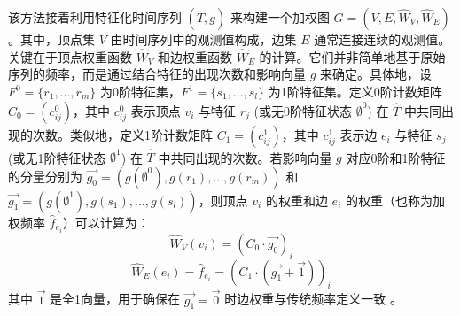 该方法接着利用特征化时间序列 $(\hat{T}, g)$ 来构建一个加权图 $G=(V,E,\hat{W}_V,\hat{W}_E)$。其中，顶点集 $V$ 由时间序列中的观测值构成，边集 $E$ 通常连接连续的观测值。关键在于顶点权重函数 $\hat{W}_V$ 和边权重函数 $\hat{W}_E$ 的计算。它们并非简单地基于原始序列的频率，而是通过结合特征的出现次数和影响向量 $g$ 来确定。具体地，设 $F^0 = \{r_1, ..., r_m\}$ 为0阶特征集，$F^1 = \{s_1, ..., s_l\}$ 为1阶特征集。定义0阶计数矩阵 $C_0=(c_{ij}^0)$，其中 $c_{ij}^0$ 表示顶点 $v_i$ 与特征 $r_j$ (或无0阶特征状态 $\emptyset^0$) 在 $\hat{T}$ 中共同出现的次数。类似地，定义1阶计数矩阵 $C_1=(c_{ij}^1)$，其中 $c_{ij}^1$ 表示边 $e_i$ 与特征 $s_j$ (或无1阶特征状态 $\emptyset^1$) 在 $\hat{T}$ 中共同出现的次数。若影响向量 $g$ 对应0阶和1阶特征的分量分别为 $\vec{g_0} = (g(\emptyset^0), g(r_1), ..., g(r_m))$ 和 $\vec{g_1} = (g(\emptyset^1), g(s_1), ..., g(s_l))$，则顶点 $v_i$ 的权重和边 $e_i$ 的权重（也称为加权频率 $\hat{f}_{e_i}$）可以计算为：
\begin{equation}
    \label{eq:featured_vertex_weight_revised}
    \hat{W}_V(v_i) = (C_0 \cdot \vec{g_0})_i
\end{equation}
\begin{equation}
    \label{eq:featured_edge_weight_revised}
    \hat{W}_E(e_i) = \hat{f}_{e_i} = (C_1 \cdot (\vec{g_1} + \vec{1}))_i
\end{equation}
其中 $\vec{1}$ 是全1向量，用于确保在 $\vec{g_1}=\vec{0}$ 时边权重与传统频率定义一致 。

